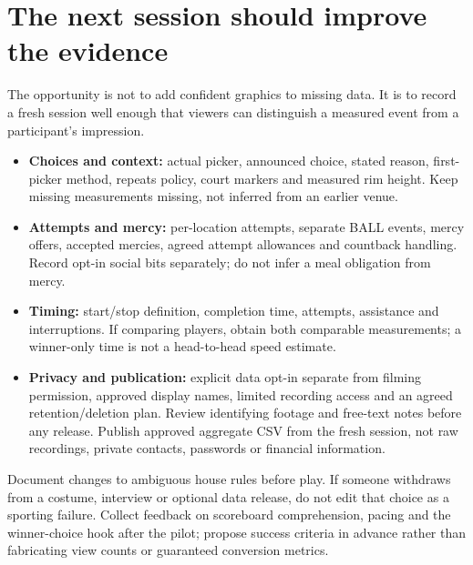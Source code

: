 \documentclass[11pt]{article}
\begin{document}
\section{The next session should improve the evidence}
The opportunity is not to add confident graphics to missing data. It is to
record a fresh session well enough that viewers can distinguish a measured
event from a participant's impression.
\begin{itemize}
\item \textbf{Choices and context:} actual picker, announced choice, stated
reason, first-picker method, repeats policy, court markers and measured rim
height. Keep missing measurements missing, not inferred from an earlier venue.
\item \textbf{Attempts and mercy:} per-location attempts, separate BALL events,
mercy offers, accepted mercies, agreed attempt allowances and countback handling.
Record opt-in social bits separately; do not infer a meal obligation from mercy.
\item \textbf{Timing:} start/stop definition, completion time, attempts,
assistance and interruptions. If comparing players, obtain both comparable
measurements; a winner-only time is not a head-to-head speed estimate.
\item \textbf{Privacy and publication:} explicit data opt-in separate from
filming permission, approved display names, limited recording access and an
agreed retention/deletion plan. Review identifying footage and free-text notes
before any release. Publish approved aggregate CSV from the fresh session,
not raw recordings, private contacts, passwords or financial information.
\end{itemize}

Document changes to ambiguous house rules before play. If someone withdraws
from a costume, interview or optional data release, do not edit that choice as
a sporting failure. Collect feedback on scoreboard comprehension, pacing and
the winner-choice hook after the pilot; propose success criteria in advance
rather than fabricating view counts or guaranteed conversion metrics.
\end{document}
